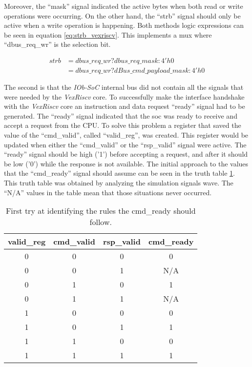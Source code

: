 Moreover, the \enquote{mask} signal indicated the active bytes when both read or write operations were occurring. On the other hand, the \enquote{strb} signal should only be active when a write operation is happening. Both methods logic expressions can be seen in equation \ref{eq:strb_vexriscv}. This implements a \acrshort{mux} where \enquote{dbus\_req\_wr} is the selection bit.

\begin{equation}
  \begin{split}
  strb& = dbus\_req\_wr ? dbus\_req\_mask : 4'h0 \\
      & = dbus\_req\_wr ? dBus\_cmd\_payload\_mask : 4'h0
  \end{split}
  \label{eq:strb_vexriscv}
\end{equation}

The second is that the \textit{IOb-SoC} internal bus did not contain all the signals that were needed by the \textit{VexRiscv} core. To successfully make the interface handshake with the \textit{VexRiscv} core an instruction and data request \enquote{ready} signal had to be generated. The \enquote{ready} signal indicated that the \acrshort{soc} was ready to receive and accept a request from the CPU. To solve this problem a register that saved the value of the \enquote{cmd\_valid}, called \enquote{valid\_reg}, was created. This register would be updated when either the \enquote{cmd\_valid} or the \enquote{rsp\_valid} signal were active. The \enquote{ready} signal should be high ('1') before accepting a request, and after it should be low ('0') while the response is not available. The initial approach to the values that the \enquote{cmd\_ready} signal should assume can be seen in the truth table \ref{tab:first_truth_table}. This truth table was obtained by analyzing the simulation signals wave. The \enquote{N/A} values in the table mean that those situations never occurred.

\begin{table}[!h]
  \centering
  \begin{tabular}{ccc|c}
  valid\_reg & cmd\_valid & rsp\_valid & cmd\_ready \\ \hline
  0          & 0          & 0          & 0          \\
  0          & 0          & 1          & N/A        \\
  0          & 1          & 0          & 1          \\
  0          & 1          & 1          & N/A        \\
  1          & 0          & 0          & 0          \\
  1          & 0          & 1          & 1          \\
  1          & 1          & 0          & 0          \\
  1          & 1          & 1          & 1         
  \end{tabular}
  \caption{First try at identifying the rules the cmd\_ready should follow.}
  \label{tab:first_truth_table}
\end{table}

